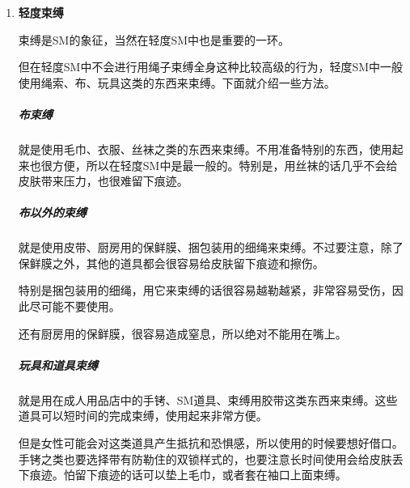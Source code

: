 \documentclass[12pt,UTF8]{ctexbook}
\begin{document}
\begin{enumerate}
普通的安睡眼罩在商店里100日元（≈7.5RMB）就可以买到。买不到的话，也可以使用毛巾或者衣物代替。性爱旅馆中也常备有一次性的眼罩使用。

\subparagraph{遮住眼睛后的玩法}

主要分成两种方式，一种是遮住眼睛不知道对方会对自己做什么而感到兴奋的方式，一种是遮住眼睛不知道对方会让自己会做什么而感到兴奋的方式。

对于前者来说的感觉就是，什么都看不见的时候身体忽然被碰到，或者忽然被爱抚预想不到的地方，或者忽然用性玩具开始爱抚，或者听到性玩具振动的声音，但是自己又不知道接下来要爱抚何处。这种不知道接下来要发生什么的感觉会让人非常兴奋。尽可能给对方做出意想不到的爱抚。

对于后者来说，就是在看不见的情况下被要求做各式各样的侍奉行为。比如忽然将阴茎凑到面前，要求口交，或者忽然将双腿打开。像这样不知道自己在做什么，也不知道对方要让自己做什么，让对方通过语言来指导接下来做什么的这种状态可以给人很高的兴奋感。

在遮住眼睛的时候，由于看不见，所以要注意不要受伤。在陌生的性爱旅馆和熟悉的自己的屋子中，都有撞到身体和从床上滚到地上去的可能。所以S不要让M离开自己的视线，不要让M受伤。

	\item \textbf{轻度束缚}

束缚是SM的象征，当然在轻度SM中也是重要的一环。

但在轻度SM中不会进行用绳子束缚全身这种比较高级的行为，轻度SM中一般使用绳索、布、玩具这类的东西来束缚。下面就介绍一些方法。

\subparagraph{布束缚}

就是使用毛巾、衣服、丝袜之类的东西来束缚。不用准备特别的东西，使用起来也很方便，所以在轻度SM中是最一般的。特别是，用丝袜的话几乎不会给皮肤带来压力，也很难留下痕迹。

\subparagraph{布以外的束缚}

就是使用皮带、厨房用的保鲜膜、捆包装用的细绳来束缚。不过要注意，除了保鲜膜之外，其他的道具都会很容易给皮肤留下痕迹和擦伤。

特别是捆包装用的细绳，用它来束缚的话很容易越勒越紧，非常容易受伤，因此尽可能不要使用。

还有厨房用的保鲜膜，很容易造成窒息，所以绝对不能用在嘴上。

\subparagraph{玩具和道具束缚}

就是用在成人用品店中的手铐、SM道具、束缚用胶带这类东西来束缚。这些道具可以短时间的完成束缚，使用起来非常方便。

但是女性可能会对这类道具产生抵抗和恐惧感，所以使用的时候要想好借口。手铐之类也要选择带有防勒住的双锁样式的，也要注意长时间使用会给皮肤丢下痕迹。怕留下痕迹的话可以垫上毛巾，或者套在袖口上面束缚。


\end{enumerate}
\end{document}
